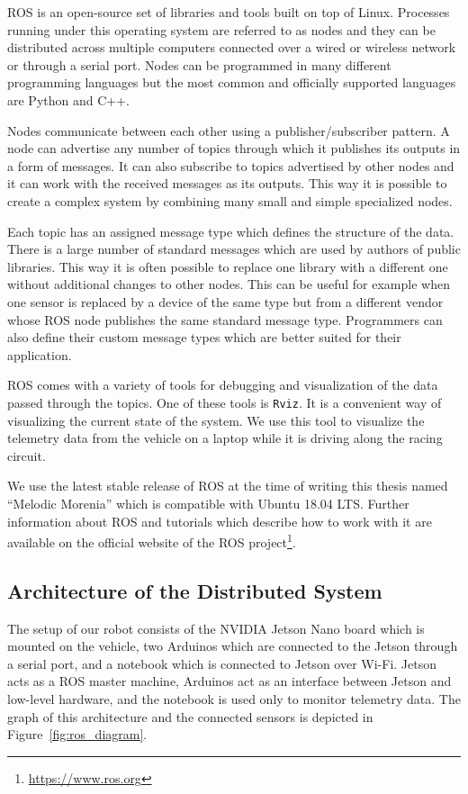 \gls{ROS} is an open-source set of libraries and tools built on top of Linux. Processes running under this operating system are referred to as nodes and they can be distributed across multiple computers connected over a wired or wireless network or through a serial port. Nodes can be programmed in many different programming languages but the most common and officially supported languages are Python and C++.

Nodes communicate between each other using a publisher/subscriber pattern. A node can advertise any number of topics through which it publishes its outputs in a form of messages. It can also subscribe to topics advertised by other nodes and it can work with the received messages as its outputs. This way it is possible to create a complex system by combining many small and simple specialized nodes.

Each topic has an assigned message type which defines the structure of the data. There is a large number of standard messages which are used by authors of public libraries. This way it is often possible to replace one library with a different one without additional changes to other nodes. This can be useful for example when one sensor is replaced by a device of the same type but from a different vendor whose \gls*{ROS} node publishes the same standard message type. Programmers can also define their custom message types which are better suited for their application.

\gls*{ROS} comes with a variety of tools for debugging and visualization of the data passed through the topics. One of these tools is \verb|Rviz|. It is a convenient way of visualizing the current state of the system. We use this tool to visualize the telemetry data from the vehicle on a laptop while it is driving along the racing circuit.

We use the latest stable release of \gls*{ROS} at the time of writing this thesis named ``Melodic Morenia'' which is compatible with Ubuntu 18.04 LTS. Further information about \gls*{ROS} and tutorials which describe how to work with it are available on the official website of the \gls*{ROS} project\footnote{\url{https://www.ros.org}}.

\subsection{Architecture of the Distributed System}

The setup of our robot consists of the NVIDIA Jetson Nano board which is mounted on the vehicle, two Arduinos which are connected to the Jetson through a serial port, and a notebook which is connected to Jetson over Wi-Fi. Jetson acts as a \gls*{ROS} master machine, Arduinos act as an interface between Jetson and low-level hardware, and the notebook is used only to monitor telemetry data. The graph of this architecture and the connected sensors is depicted in Figure~\ref{fig:ros_diagram}.

